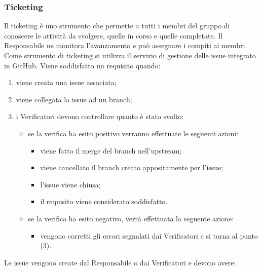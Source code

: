 \documentclass[a4paper, 12pt]{article}
\begin{document}
\subsubsection{Ticketing}
\label{sec:Ticketing}
Il ticketing è uno strumento che permette a tutti i membri del gruppo di
conoscere le attività da svolgere, quelle in corso e quelle completate. Il
Responsabile ne monitora l'avanzamento e può assegnare i compiti ai membri. Come
strumento di ticketing si utilizza il servizio di gestione delle issue integrato
in GitHub. Viene soddisfatto un requisito quando:
\begin{enumerate}
    \item viene creata una issue associata;
    \item viene collegata la issue ad un branch;
    \item i Verificatori devono controllare quanto è stato svolto: \begin{itemize}
        \item se la verifica ha esito positivo verranno effettuate le seguenti azioni: \begin{itemize}
            \item viene fatto il merge del branch nell'upstream;
            \item viene cancellato il branch creato appositamente per l'issue;
            \item l'issue viene chiusa;
            \item il requisito viene considerato soddisfatto. 
        \end{itemize}
        \item se la verifica ha esito negativo, verrà effettuata la seguente
        azione: \begin{itemize}
            \item vengono corretti gli errori segnalati dai Verificatori e si
            torna al punto (3).
        \end{itemize}
    \end{itemize}
\end{enumerate}
Le issue vengono create dal Responsabile o dai Verificatori e devono avere:
\end{document}
